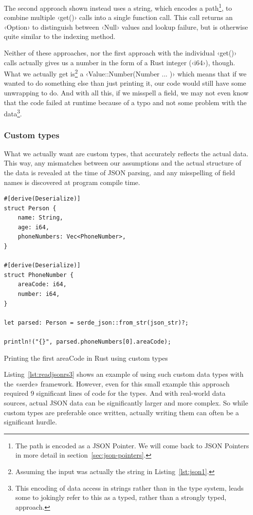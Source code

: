 The second approach shown instead uses a string, which encodes a path\footnote{The path is encoded as a JSON Pointer. We will come back to JSON Pointers in more detail in section~\ref{sec:json-pointers}.}, to combine multiple ‹get()› calls into a single function call. This call returns an ‹Option› to distinguish between ‹Null› values and lookup failure, but is otherwise quite similar to the indexing method.

Neither of these approaches, nor the first approach with the individual ‹get()› calls actually gives us a number in the form of a Rust integer (‹i64›), though. What we actually get is\footnote{Assuming the input was actually the string in Listing~\ref{lst:json1}.} a ‹Value::Number(Number { ... })› which means that if we wanted to do something else than just printing it, our code would still have some unwrapping to do. And with all this, if we misspell a field, we may not even know that the code failed at runtime because of a typo and not some problem with the data\footnote{This encoding of data access in strings rather than in the type system, leads some to jokingly refer to this as a  typed, rather than a strongly typed, approach.}.

\subsubsection{Custom types}

What we actually want are custom types, that accurately reflects the actual data. This way, any mismatches between our assumptions and the actual structure of the data is revealed at the time of JSON parsing, and any misspelling of field names is discovered at program compile time.

\begin{listing}[ht!]
\begin{verbatim}
#[derive(Deserialize)]
struct Person {
    name: String,
    age: i64,
    phoneNumbers: Vec<PhoneNumber>,
}

#[derive(Deserialize)]
struct PhoneNumber {
    areaCode: i64,
    number: i64,
}

let parsed: Person = serde_json::from_str(json_str)?;

println!("{}", parsed.phoneNumbers[0].areaCode);
\end{verbatim}
\caption{Printing the first areaCode in Rust using custom types}
\label{lst:readjsonrs3}
\end{listing}

Listing~\ref{lst:readjsonrs3} shows an example of using such custom data types with the «serde» framework. However, even for this small example this approach required 9 significant lines of code for the types. And with real-world data sources, actual JSON data can be significantly larger and more complex. So while custom types are preferable once written, actually writing them can often be a significant hurdle.

